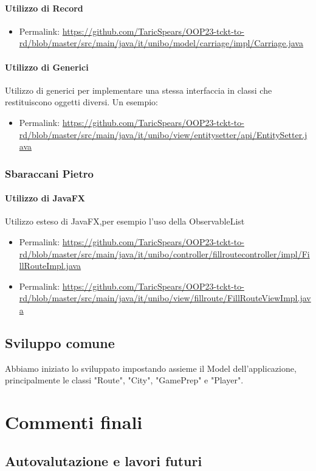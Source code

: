 \documentclass[a4paper,12pt]{report}
\begin{document}
\subsubsection{Utilizzo di Record}
\begin{itemize}
    \item Permalink: \url{https://github.com/TaricSpears/OOP23-tckt-to-rd/blob/master/src/main/java/it/unibo/model/carriage/impl/Carriage.java}
\end{itemize}
\subsubsection{Utilizzo di Generici}
Utilizzo di generici per implementare una stessa interfaccia in classi che restituiscono oggetti diversi. Un esempio:
\begin{itemize}
    \item Permalink: \url{https://github.com/TaricSpears/OOP23-tckt-to-rd/blob/master/src/main/java/it/unibo/view/entitysetter/api/EntitySetter.java}
\end{itemize}
\newpage
\subsection{Sbaraccani Pietro}
\subsubsection{Utilizzo di JavaFX}
Utilizzo esteso di JavaFX,per esempio l'uso della ObservableList
\begin{itemize}
    \item Permalink: \url{https://github.com/TaricSpears/OOP23-tckt-to-rd/blob/master/src/main/java/it/unibo/controller/fillroutecontroller/impl/FillRouteImpl.java}
    \item Permalink: \url{https://github.com/TaricSpears/OOP23-tckt-to-rd/blob/master/src/main/java/it/unibo/view/fillroute/FillRouteViewImpl.java}
\end{itemize}
\section{Sviluppo comune}
Abbiamo iniziato lo sviluppato impostando assieme il Model dell'applicazione, principalmente le classi "Route", "City", "GamePrep" e "Player". 
\newpage
\chapter{Commenti finali}
\section{Autovalutazione e lavori futuri}
\end{document}
